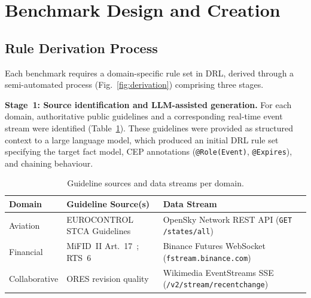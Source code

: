 
\section{Benchmark Design and Creation}\label{sec:design}

\subsection{Rule Derivation Process}\label{sec:rule-derivation}

Each benchmark requires a domain-specific rule set in DRL, derived through a semi-automated process (Fig.~\ref{fig:derivation}) comprising three stages.

\textbf{Stage~1: Source identification and LLM-assisted generation.}
For each domain, authoritative public guidelines and a corresponding real-time event stream were identified (Table~\ref{tab:sources}).
These guidelines were provided as structured context to a large language model, which produced an initial DRL rule set specifying the target fact model, CEP annotations (\texttt{@Role(Event)}, \texttt{@Expires}), and chaining behaviour.

\begin{table}[h]
\centering
\caption{Guideline sources and data streams per domain.}\label{tab:sources}
\small
\begin{tabular}{@{} l p{} p{} @{}}
\toprule
\textbf{Domain} & \textbf{Guideline Source(s)} & \textbf{Data Stream} \\
\midrule
Aviation        & EUROCONTROL STCA Guidelines~\cite{eurocontrol_stca}
                & OpenSky Network REST API \newline (\texttt{GET /states/all}) \\
\addlinespace
Financial       & MiFID~II Art.~17~\cite{esma_mifid2_art17}; \newline
                  RTS~6~\cite{eu_rts6_2017}
                & Binance Futures WebSocket \newline (\texttt{fstream.binance.com}) \\
\addlinespace
Collaborative   & ORES revision quality~\cite{halfaker2020ores}
                & Wikimedia EventStreams SSE \newline (\texttt{/v2/stream/recentchange}) \\
\bottomrule
\end{tabular}
\end{table}

